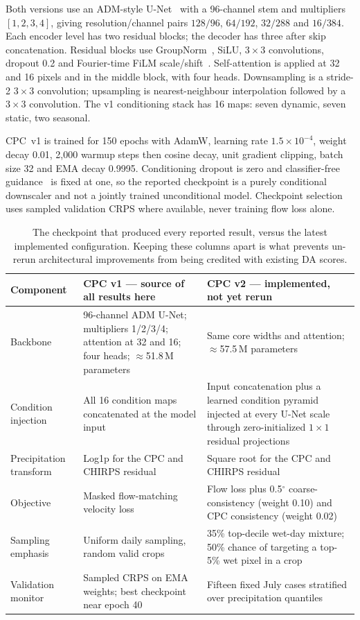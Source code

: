 \documentclass[10pt,twocolumn]{article}
\begin{document}
Both versions use an ADM-style U-Net~\cite{dhariwal2021} with a 96-channel
stem and multipliers $[1,2,3,4]$, giving resolution/channel pairs $128/96$,
$64/192$, $32/288$ and $16/384$. Each encoder level has two residual blocks;
the decoder has three after skip concatenation. Residual blocks use
GroupNorm~\cite{wu2018}, SiLU, $3\times3$ convolutions, dropout 0.2 and
Fourier-time FiLM scale/shift~\cite{perez2018}. Self-attention is applied at
32 and 16 pixels and in the middle block, with four heads. Downsampling is a
stride-2 $3\times3$ convolution; upsampling is nearest-neighbour interpolation
followed by a $3\times3$ convolution. The v1 conditioning stack has 16 maps:
seven dynamic, seven static, two seasonal.

CPC~v1 is trained for 150 epochs with AdamW, learning rate
$1.5\times10^{-4}$, weight decay 0.01, 2{,}000 warmup steps then cosine decay,
unit gradient clipping, batch size 32 and EMA decay 0.9995. Conditioning
dropout is zero and classifier-free guidance~\cite{ho2022cfg} is fixed at one,
so the reported checkpoint is a purely conditional downscaler and not a jointly
trained unconditional model. Checkpoint selection uses sampled validation CRPS
where available, never training flow loss alone.

\begin{table}[t]
\centering
\caption{The checkpoint that produced every reported result, versus the latest
implemented configuration. Keeping these columns apart is what prevents
un-rerun architectural improvements from being credited with existing DA
scores.}
\label{tab:architecture}
\small
\begin{tabular}{p{}p{}p{}}
\toprule
Component & \textbf{CPC v1} --- source of all results here & CPC v2 --- implemented, not yet rerun \\
\midrule
Backbone & 96-channel ADM U-Net; multipliers 1/2/3/4; attention at 32 and 16; four heads; $\approx$51.8\,M parameters & Same core widths and attention; $\approx$57.5\,M parameters \\
Condition injection & All 16 condition maps concatenated at the model input & Input concatenation plus a learned condition pyramid injected at every U-Net scale through zero-initialized $1\times1$ residual projections \\
Precipitation transform & Log1p for the CPC and CHIRPS residual & Square root for the CPC and CHIRPS residual \\
Objective & Masked flow-matching velocity loss & Flow loss plus 0.5$^\circ$ coarse-consistency (weight 0.10) and CPC consistency (weight 0.02) \\
Sampling emphasis & Uniform daily sampling, random valid crops & 35\% top-decile wet-day mixture; 50\% chance of targeting a top-5\% wet pixel in a crop \\
Validation monitor & Sampled CRPS on EMA weights; best checkpoint near epoch 40 & Fifteen fixed July cases stratified over precipitation quantiles \\
\bottomrule
\end{tabular}
\end{table}
\end{document}
